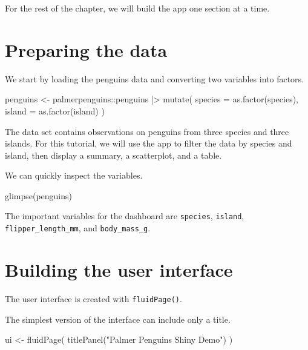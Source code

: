\documentclass[
  letterpaper,
  DIV=11,
  numbers=noendperiod]{scrreprt}
\newenvironment{Shaded}{\begin{snugshade}}{\end{snugshade}}
\newcommand{\AttributeTok}[1]{\textcolor[rgb]{0.40,0.45,0.13}{#1}}
\newcommand{\FunctionTok}[1]{\textcolor[rgb]{0.28,0.35,0.67}{#1}}
\newcommand{\NormalTok}[1]{\textcolor[rgb]{0.00,0.23,0.31}{#1}}
\newcommand{\OtherTok}[1]{\textcolor[rgb]{0.00,0.23,0.31}{#1}}
\newcommand{\SpecialCharTok}[1]{\textcolor[rgb]{0.37,0.37,0.37}{#1}}
\newcommand{\StringTok}[1]{\textcolor[rgb]{0.13,0.47,0.30}{#1}}
\begin{document}
For the rest of the chapter, we will build the app one section at a
time.

\section{Preparing the data}\label{preparing-the-data}

We start by loading the penguins data and converting two variables into
factors.

\begin{Shaded}
\begin{Highlighting}[]
\NormalTok{penguins }\OtherTok{\textless{}{-}}\NormalTok{ palmerpenguins}\SpecialCharTok{::}\NormalTok{penguins }\SpecialCharTok{|\textgreater{}}
  \FunctionTok{mutate}\NormalTok{(}
    \AttributeTok{species =} \FunctionTok{as.factor}\NormalTok{(species),}
    \AttributeTok{island =} \FunctionTok{as.factor}\NormalTok{(island)}
\NormalTok{  )}
\end{Highlighting}
\end{Shaded}

The data set contains observations on penguins from three species and
three islands. For this tutorial, we will use the app to filter the data
by species and island, then display a summary, a scatterplot, and a
table.

We can quickly inspect the variables.

\begin{Shaded}
\begin{Highlighting}[]
\FunctionTok{glimpse}\NormalTok{(penguins)}
\end{Highlighting}
\end{Shaded}

The important variables for the dashboard are \texttt{species},
\texttt{island}, \texttt{flipper\_length\_mm}, and
\texttt{body\_mass\_g}.

\section{Building the user interface}\label{building-the-user-interface}

The user interface is created with \texttt{fluidPage()}.

The simplest version of the interface can include only a title.

\begin{Shaded}
\begin{Highlighting}[]
\NormalTok{ui }\OtherTok{\textless{}{-}} \FunctionTok{fluidPage}\NormalTok{(}
  \FunctionTok{titlePanel}\NormalTok{(}\StringTok{"Palmer Penguins Shiny Demo"}\NormalTok{)}
\NormalTok{)}
\end{Highlighting}
\end{Shaded}
\end{document}
